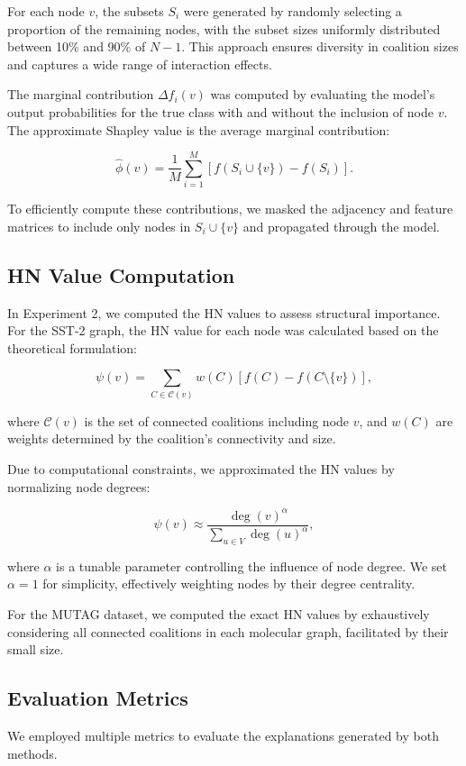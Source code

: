 \documentclass{article}
\begin{document}
For each node $v$, the subsets $S_i$ were generated by randomly selecting a proportion of the remaining nodes, with the subset sizes uniformly distributed between 10\% and 90\% of $N-1$. This approach ensures diversity in coalition sizes and captures a wide range of interaction effects.

The marginal contribution $\Delta f_i(v)$ was computed by evaluating the model's output probabilities for the true class with and without the inclusion of node $v$. The approximate Shapley value is the average marginal contribution:

\[
\hat{\phi}(v) = \frac{1}{M} \sum_{i=1}^{M} \left[ f(S_i \cup \{v\}) - f(S_i) \right].
\]

To efficiently compute these contributions, we masked the adjacency and feature matrices to include only nodes in $S_i \cup \{v\}$ and propagated through the model.

\subsection{HN Value Computation}
In Experiment 2, we computed the HN values to assess structural importance. For the SST-2 graph, the HN value for each node was calculated based on the theoretical formulation:

\[
\psi(v) = \sum_{C \in \mathcal{C}(v)} w(C) \left[ f(C) - f(C \setminus \{v\}) \right],
\]

where $\mathcal{C}(v)$ is the set of connected coalitions including node $v$, and $w(C)$ are weights determined by the coalition's connectivity and size.

Due to computational constraints, we approximated the HN values by normalizing node degrees:

\[
\psi(v) \approx \frac{\deg(v)^\alpha}{\sum_{u \in V} \deg(u)^\alpha},
\]

where $\alpha$ is a tunable parameter controlling the influence of node degree. We set $\alpha=1$ for simplicity, effectively weighting nodes by their degree centrality.

For the MUTAG dataset, we computed the exact HN values by exhaustively considering all connected coalitions in each molecular graph, facilitated by their small size.

\subsection{Evaluation Metrics}
We employed multiple metrics to evaluate the explanations generated by both methods.
\end{document}
